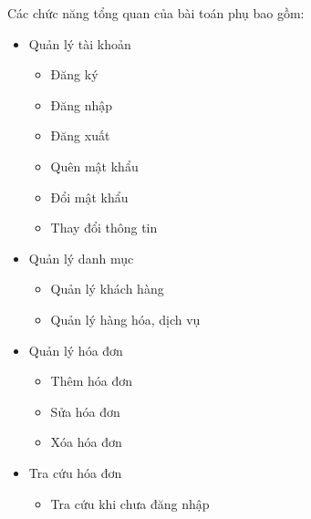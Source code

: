 Các chức năng tổng quan của bài toán phụ bao gồm:
\begin{itemize}

    \item Quản lý tài khoản

          \begin{itemize}

              \item Đăng ký

              \item Đăng nhập

              \item Đăng xuất

              \item Quên mật khẩu

              \item Đổi mật khẩu

              \item Thay đổi thông tin

          \end{itemize}

    \item Quản lý danh mục

          \begin{itemize}

              \item Quản lý khách hàng

              \item Quản lý hàng hóa, dịch vụ

          \end{itemize}

    \item Quản lý hóa đơn

          \begin{itemize}

              \item Thêm hóa đơn

              \item Sửa hóa đơn

              \item Xóa hóa đơn

          \end{itemize}

    \item Tra cứu hóa đơn

          \begin{itemize}

              \item Tra cứu khi chưa đăng nhập


\end{itemize}
\end{itemize}
